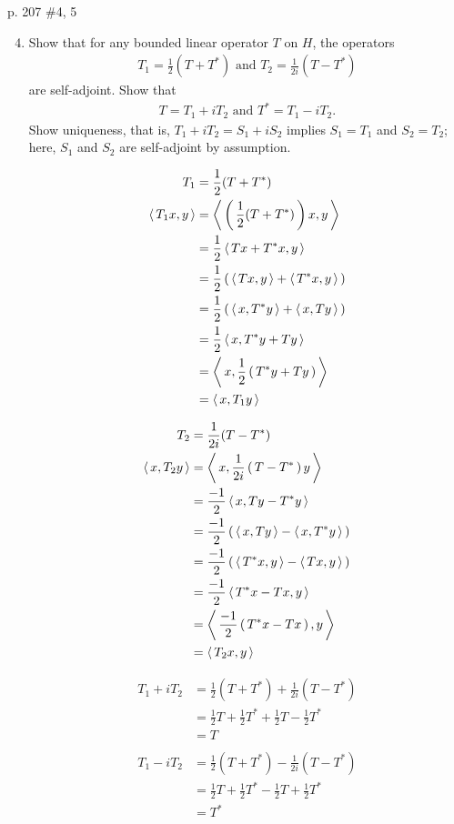 \documentclass[10pt,a4paper]{report}
\begin{document}
\newpage
p. 207 \#4, 5

\begin{enumerate}
	\setcounter{enumi}{3}
	\item Show that for any bounded linear operator $T$ on $H$, the operators 
	\begin{align*}
		T_1=\frac{1}{2}(T+T^*) \text{  and  } T_2=\frac{1}{2i}(T-T^*)
	\end{align*}are self-adjoint.  Show that 
	\begin{align*}
		T=T_1+iT_2 \text{ and }  T^*=T_1-iT_2.
	\end{align*}Show uniqueness, that is, $T_1+iT_2=S_1+iS_2$ implies $S_1=T_1$ and $S_2=T_2$; here, $S_1$ and $S_2$ are self-adjoint by assumption.

\begin{multicols}{2}	
	\begin{align*}
		T_1&=\frac{1}{2}(T+T^*) \\
		\left \langle\, T_1x, y \,\right \rangle &= \left \langle\, \left (\, \frac{1}{2}(T+T^*) \,\right )x, y \,\right \rangle \\
		&= \frac{1}{2}\left \langle\, Tx+T^*x, y \,\right \rangle \\
		&= \frac{1}{2}\left (\, \left \langle\, Tx, y \,\right \rangle +\left \langle\, T^*x, y \,\right \rangle  \,\right )\\
		&= \frac{1}{2}\left (\, \left \langle\, x, T^*y \,\right \rangle + \left \langle\, x, Ty \,\right \rangle \,\right ) \\
		&= \frac{1}{2}\left \langle\, x, T^*y +  Ty \,\right \rangle \\
		&= \left \langle\, x, \frac{1}{2}\left (\, T^*y +  Ty \,\right ) \,\right \rangle \\
		&= \left \langle\, x, T_1y \,\right \rangle
	\end{align*}
	
	\begin{align*}
		T_2&=\frac{1}{2i}(T-T^*) \\
		\left \langle\, x, T_2y \,\right \rangle &= \left \langle\, x, \frac{1}{2i}\left (\, T-T^* \,\right ) y \,\right \rangle \\
		&= \frac{-1}{2}\left \langle\, x, Ty-T^*y \,\right \rangle \\
		&= \frac{-1}{2}\left (\, \left \langle\, x, Ty \,\right \rangle -\left \langle\, x, T^*y \,\right \rangle  \,\right )\\
		&= \frac{-1}{2}\left (\, \left \langle\, T^*x, y \,\right \rangle - \left \langle\, Tx, y \,\right \rangle \,\right ) \\
		&= \frac{-1}{2}\left \langle\, T^*x -  Tx, y \,\right \rangle \\
		&= \left \langle\, \frac{-1}{2}\left (\, T^*x -  Tx \,\right ), y \,\right \rangle \\
		&= \left \langle\, T_2x, y \,\right \rangle
	\end{align*}	
\end{multicols}
\begin{multicols}{2}
	\begin{align*}
		T_1+iT_2 &= \frac{1}{2}(T+T^*) + \frac{1}{2i}(T-T^*) \\
		&= \frac{1}{2}T+\frac{1}{2}T^* + \frac{1}{2}T-\frac{1}{2}T^* \\
		&= T
	\end{align*}
	\begin{align*}
\\		T_1-iT_2 &= \frac{1}{2}(T+T^*) - \frac{1}{2i}(T-T^*) \\
		&= \frac{1}{2}T+\frac{1}{2}T^* - \frac{1}{2}T+\frac{1}{2}T^* \\
		&= T^*
	\end{align*}
\end{multicols}


\end{enumerate}
\end{document}
